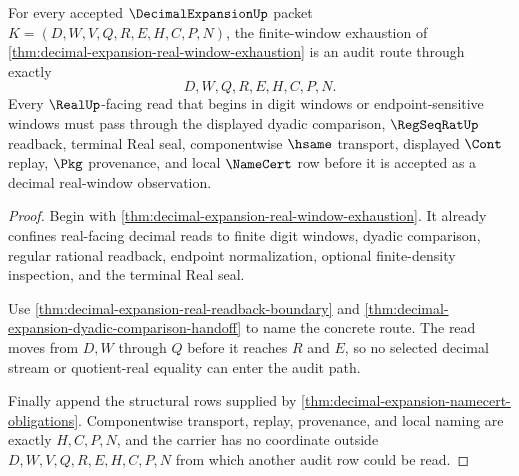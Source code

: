 \begin{theorem}
\label{thm:decimal-expansion-real-window-exhaustion-audit-route}
For every accepted $\DecimalExpansionUp$ packet $K=(D,W,V,Q,R,E,H,C,P,N)$, the finite-window exhaustion of \autoref{thm:decimal-expansion-real-window-exhaustion} is an audit route through exactly
$$
D,W,Q,R,E,H,C,P,N .
$$
Every $\RealUp$-facing read that begins in digit windows or endpoint-sensitive windows must pass through the displayed dyadic comparison, $\RegSeqRatUp$ readback, terminal Real seal, componentwise $\hsame$ transport, displayed $\Cont$ replay, $\Pkg$ provenance, and local $\NameCert$ row before it is accepted as a decimal real-window observation.
\end{theorem}
\begin{proof}
Begin with \autoref{thm:decimal-expansion-real-window-exhaustion}. It already confines real-facing decimal reads to finite digit windows, dyadic comparison, regular rational readback, endpoint normalization, optional finite-density inspection, and the terminal Real seal.

Use \autoref{thm:decimal-expansion-real-readback-boundary} and \autoref{thm:decimal-expansion-dyadic-comparison-handoff} to name the concrete route. The read moves from $D,W$ through $Q$ before it reaches $R$ and $E$, so no selected decimal stream or quotient-real equality can enter the audit path.

Finally append the structural rows supplied by \autoref{thm:decimal-expansion-namecert-obligations}. Componentwise transport, replay, provenance, and local naming are exactly $H,C,P,N$, and the carrier has no coordinate outside $D,W,V,Q,R,E,H,C,P,N$ from which another audit row could be read.
\end{proof}

